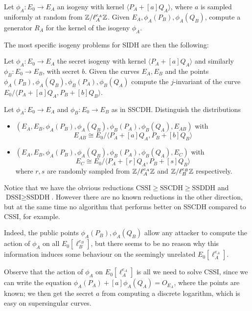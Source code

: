 \begin{problem}
    Let $\phi_A:E_0\to E_A$ an isogeny with kernel $\langle P_A+[a]Q_A \rangle$, where $a$ is sampled uniformly at random from $\mathbb{Z}/\ell_A^{e_A}\mathbb{Z}$. Given $E_A, \phi_A(P_B),\phi_A(Q_B)$, compute a generator $R_A$ for the kernel of the isogeny $\phi_A$.
\end{problem}

The most specific isogeny problems for SIDH are then the following:

\begin{problem}
    Let $\phi_A:E_0\to E_A$ the secret isogeny with kernel $\langle P_A+[a]Q_A \rangle$ and similarly $\phi_B:E_0\to E_B$, with secret $b$. Given the curves $E_A,E_B$ and the points $\phi_A(P_B),\phi_A(Q_B),\phi_B(P_A),\phi_B(Q_A)$ compute the $j$-invariant of the curve $E_0/\langle P_A+[a]Q_A,P_B+[b]Q_B \rangle$.
\end{problem}

\begin{problem}
    Let $\phi_A:E_0\to E_A$ and $\phi_B:E_0\to E_B$ as in SSCDH. Distinguish the distributions
    \begin{itemize}
        \item $(E_A,E_B,\phi_A(P_B),\phi_A(Q_B),\phi_B(P_A),\phi_B(Q_A), E_{AB})$ with $$E_{AB}\cong E_0/\langle P_A+[a]Q_A,P_B+[b]Q_B \rangle$$
        \item $(E_A,E_B,\phi_A(P_B),\phi_A(Q_B),\phi_B(P_A),\phi_B(Q_A), E_C)$ with $$E_C\cong E_0/\langle P_A+[r]Q_A,P_B+[s]Q_B \rangle$$
        where $r,s$ are randomly sampled from $\mathbb{Z}/\ell_A^{e_A}\mathbb{Z}$ and $\mathbb{Z}/\ell_B^{e_B}\mathbb{Z}$ respectively.
    \end{itemize}
\end{problem}

Notice that we have the obvious reductions $\text{CSSI}\ge\text{SSCDH}\ge\text{SSDDH}$ and $\text{DSSI}\ge\text{SSDDH}$. However there are no known reductions in the other direction, but at the same time no algorithm that performs better on SSCDH compared to CSSI, for example.

Indeed, the public points $\phi_A(P_B),\phi_A(Q_B)$ allow any attacker to compute the action of $\phi_A$ on all $E_0[\ell_B^{e_B}]$, but there seems to be no reason why this information induces some behaviour on the seemingly unrelated $E_0[\ell_A^{e_A}]$.

Observe that the action of $\phi_A$ on $E_0[\ell_A^{e_A}]$ is all we need to solve CSSI, since we can write the equation $\phi_A(P_A)+[a]\phi_A(Q_A)=O_{E_A}$, where the points are known; we then get the secret $a$ from computing a discrete logarithm, which is easy on supersingular curves.

